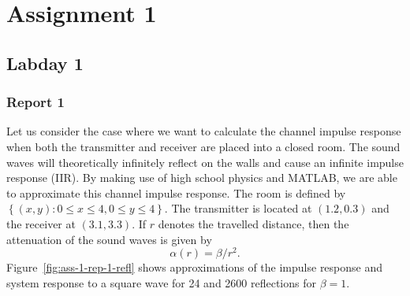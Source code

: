 \documentclass[11pt,titlepage]{report}
\begin{document}
\chapter{Assignment 1}
\section{Labday 1}
\subsection{Report 1}
Let us consider the case where we want to calculate the channel impulse response when both the transmitter and receiver are placed into a closed room. The sound waves will theoretically infinitely reflect on the walls and cause an infinite impulse response (IIR). By making use of high school physics and MATLAB, we are able to approximate this channel impulse response. The room is defined by $\left\{(x,y) : 0 \le x \le 4, 0 \le y \le 4 \right\}$. The transmitter is located at $(1.2, 0.3)$ and the receiver at $(3.1, 3.3)$. If $r$ denotes the travelled distance, then the attenuation of the sound waves is given by
\[
	\alpha(r) = \beta / r^2.
\]
Figure~\ref{fig:ass-1-rep-1-refl} shows approximations of the impulse response and system response to a square wave for \num{24} and \num{2600} reflections for $\beta = 1$.
\end{document}
